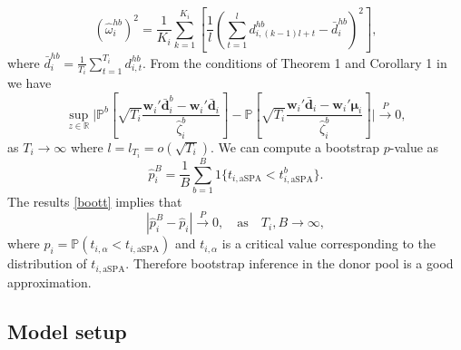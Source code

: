 \documentclass[11pt]{article}
\newcommand{\R}{\mathbb{R}}
\newcommand{\dbf}{\textbf{d}}
\newcommand{\Prob}{\mathbb{P}}
\def\mbf#1{\mathbf{#1}} %
\theoremstyle{definition}
\begin{document}
\begin{equation} \label{whb}
	\left(\hat{\omega}_{i}^{hb}\right)^2 = \frac{1}{K_i}\sum_{k=1}^{K_i}\left[\frac{1}{l}\left(\sum_{t=1}^l d^{hb}_{i,(k-1)l + t} - \bar{d}^{hb}_{i}\right)^2\right],
\end{equation}
where $\bar{d}^{hb}_{i} = \frac{1}{T_i}\sum_{t=1}^{T_i} d^{hb}_{i,t}$. From the conditions of Theorem 1 and Corollary 1 in \cite{quaedvlieg2021multi}  we have 
\begin{equation} \label{boott}
  \sup_{z\in\R}\Big\vert \Prob^b\left[\sqrt{T_i}\frac{\textbf{w}_i'\bar{\dbf}^b_{i} - \textbf{w}_i'\bar{\dbf}_{i} }{\hat{\zeta}^b_{i}}\right] 
  - \Prob\left[\sqrt{T_i}\frac{\textbf{w}_i'\bar{\dbf}_{i} -  \textbf{w}_i'\mbf{\mu}_{i}}{\hat{\zeta}^b_{i}}\right]
  \Big\vert \overset{P}{\longrightarrow} 0,
\end{equation}
as $T_i\to\infty$ where $l=l_{T_i}=o(\sqrt{T_i})$. We can compute a bootstrap $p$-value as 
$$
  \hat{p}_i^B = \frac{1}{B}\sum_{b=1}^B 1\{t_{i,\text{aSPA}} < t^b_{i,\text{aSPA}}\}. 
$$
The results \eqref{boott} implies that 
\begin{equation} \label{bootp}
  |\hat p_i^B - \hat p_i| \overset{P}{\to} 0, \quad \text{as} \quad T_i,B \to \infty, 
\end{equation}
    where $\hat p_i = \Prob(t_{i,\alpha} < t_{i,\text{aSPA}})$ and $t_{i,\alpha}$ is a critical value corresponding to the distribution of $t_{i,\text{aSPA}}$. Therefore bootstrap inference in the donor pool is a good approximation. %





\subsection{Model setup}
\label{modelsetup}
\end{document}
